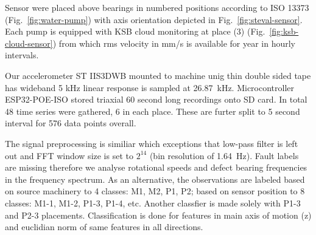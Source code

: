 \documentclass{llncs}
\begin{document}
Sensor were placed above bearings in numbered positions according to ISO 13373 (Fig.~\ref{fig:water-pump}) with axis orientation depicted in Fig.~\ref{fig:steval-sensor}. Each pump is equipped with KSB cloud monitoring at place (3) (Fig.~\ref{fig:ksb-cloud-sensor}) from which rms velocity in mm/s is available for year in hourly intervals. 

Our accelerometer ST IIS3DWB mounted to machine unig thin double sided tape has wideband 5 kHz linear response is sampled at 26.87~kHz. Microcontroller ESP32-POE-ISO stored triaxial 60 second long recordings onto SD card. In total 48 time series were gathered, 6 in each place. These are furter split to 5 second interval for 576 data points overall.

The signal preprocessing is similiar which exceptions that low-pass filter is left out and FFT window size is set to $2^{14}$ (bin resolution of 1.64~Hz). Fault labels are missing therefore we analyse rotational speeds and defect bearing frequencies in the frequency spectrum. As an alternative, the observations are labeled based on source machinery to 4 classes: M1, M2, P1, P2; based on sensor position to 8 classes: M1-1, M1-2, P1-3, P1-4, etc. Another classfier is made solely with P1-3 and P2-3 placements.
Classification is done for features in main axis of motion (z) and euclidian norm of same features in all directions.
\end{document}
